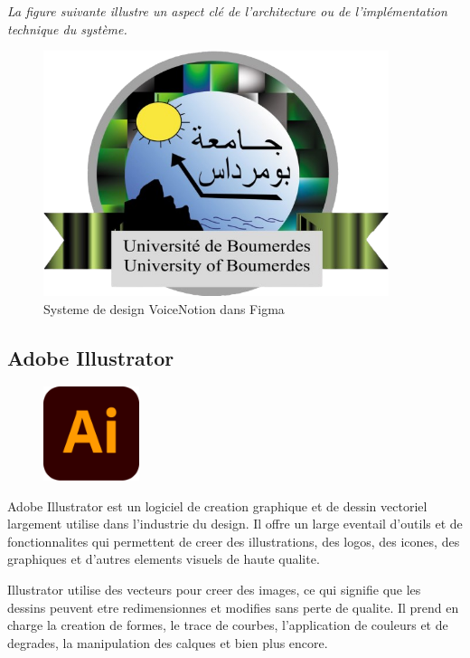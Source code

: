 \noindent
\textit{La figure suivante illustre un aspect clé de l'architecture ou de l'implémentation technique du système.}
\begin{figure}[H]
\centering
\includegraphics[width=0.9\textwidth]{assets/docs/figma_design_system.png}
\caption{Systeme de design VoiceNotion dans Figma}
\label{fig:figma-design}
\end{figure}

\subsection{Adobe Illustrator}
\begin{figure}
    \centering
    \includegraphics[width=0.25\textwidth]{assets/docs/illustrator.png}
\end{figure}
Adobe Illustrator est un logiciel de creation graphique et de dessin vectoriel largement utilise dans l'industrie du design. Il offre un large eventail d'outils et de fonctionnalites qui permettent de creer des illustrations, des logos, des icones, des graphiques et d'autres elements visuels de haute qualite. 

Illustrator utilise des vecteurs pour creer des images, ce qui signifie que les dessins peuvent etre redimensionnes et modifies sans perte de qualite. Il prend en charge la creation de formes, le trace de courbes, l'application de couleurs et de degrades, la manipulation des calques et bien plus encore.

